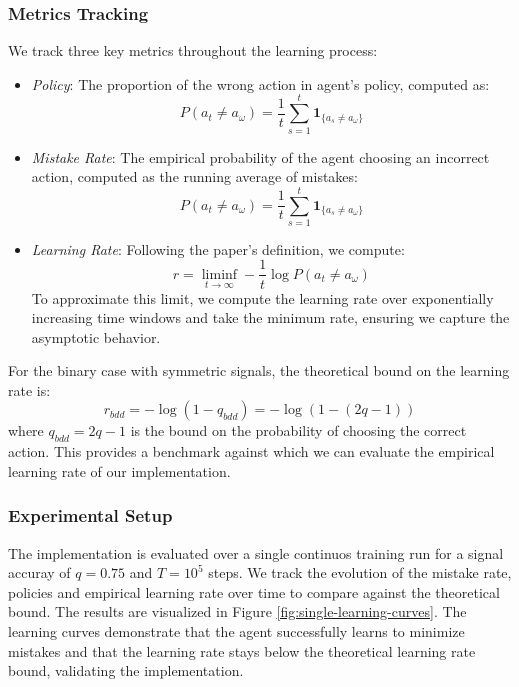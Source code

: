 \subsubsection*{Metrics Tracking}
We track three key metrics throughout the learning process:

\begin{itemize}
    \item \textit{Policy}: The proportion of the wrong action in agent's policy, computed as:
    \[
        P(a_t \neq a_\omega) = \frac{1}{t}\sum_{s=1}^t \mathbf{1}_{\{a_s \neq a_\omega\}}
    \]

    \item \textit{Mistake Rate}: The empirical probability of the agent choosing an incorrect action, computed as the running average of mistakes:
    \[
        P(a_t \neq a_\omega) = \frac{1}{t}\sum_{s=1}^t \mathbf{1}_{\{a_s \neq a_\omega\}}
    \]
    
    \item \textit{Learning Rate}: Following the paper's definition, we compute:
    \[
        r = \liminf_{t \to \infty} -\frac{1}{t} \log P(a_t \neq a_\omega)
    \]
    To approximate this limit, we compute the learning rate over exponentially increasing time windows and take the minimum rate, ensuring we capture the asymptotic behavior.
\end{itemize}
For the binary case with symmetric signals, the theoretical bound on the learning rate is:
\[
    r_{bdd} = -\log(1-q_{bdd}) = -\log(1-(2q-1))
\]
where $q_{bdd} = 2q-1$ is the bound on the probability of choosing the correct action. This provides a benchmark against which we can evaluate the empirical learning rate of our implementation.

\subsubsection*{Experimental Setup}
The implementation is evaluated over a single continuos training run for a signal accuray of $q=0.75$ and $T=10^5$ steps. We track the evolution of the mistake rate, policies and empirical learning rate over time to compare against the theoretical bound. The results are visualized in Figure \ref{fig:single-learning-curves}. The learning curves demonstrate that the agent successfully learns to minimize mistakes and that the learning rate stays below the theoretical learning rate bound, validating the implementation.

